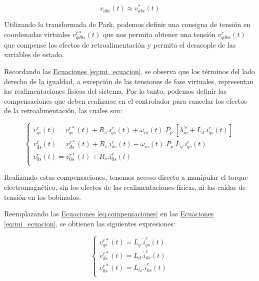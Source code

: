 \documentclass{article}
\begin{document}
\begin{equation}
    v_{abc}(t) \approx v^*_{abc}(t)
\end{equation}

Utilizando la transformada de Park, podemos definir una consigna de tensión en coordenadas virtuales 
$v^{r*}_{qd0s}(t)$ que nos permita obtener una tensión $v^{r}_{qd0s}(t)$ que compense los efectos de 
retroalimentación y permita el desacople de las variables de estado.

Recordando las \hyperref[eq:mi_ecuacion]{Ecuaciones \ref*{eq:mi_ecuacion}}, se observa que los términos 
del lado derecho de la igualdad, a excepción de las tensiones de fase virtuales, representan las 
realimentaciones físicas del sistema. Por lo tanto, podemos definir las compensaciones que deben 
realizarse en el controlador para cancelar los efectos de la retroalimentación, las cuales son:

\begin{equation}\label{eq:compensaciones}
    \begin{cases}
        v^r_{qs}(t) = v^{r*}_{qs}(t) + R_{s}.i_{qs}^r(t) + \omega_m(t).P_p.[\lambda^{\prime r}_m + L_d.i_{qs}^r(t)] \\
        v^r_{ds}(t) = v^{r*}_{ds}(t) + R_{s}.i_{ds}^r(t) - \omega_m(t).P_p.L_q.i_{qs}^r(t) \\
        v^r_{0s}(t) = v^{r*}_{0s}(t) + R_{s}.i_{0s}^r(t) \\
    \end{cases}
\end{equation}

Realizando estas compensaciones, tenemos acceso directo a manipular el torque electromagnético, 
sin los efectos de las realimentaciones físicas, ni las caídas de tensión en los bobinados.

Reemplazando las \hyperref[eq:compensaciones]{Ecuaciones \ref*{eq:compensaciones}} en las
\hyperref[eq:mi_ecuacion]{Ecuaciones \ref*{eq:mi_ecuacion}}, se obtienen las siguientes expresiones:

\begin{equation}\label{eq:proporcionlaidad_corrientes_tensiones_de_entrada}
    \begin{cases}
        v^{r*}_{qs}(t) = L_q. \dot{i}_{qs}^r(t) \\
        v^{r*}_{ds}(t) = L_d. \dot{i}_{ds}^r(t) \\
        v^{r*}_{0s}(t) = L_{ls}. \dot{i}_{0s}^r(t) \\
    \end{cases}
\end{equation}
\end{document}
